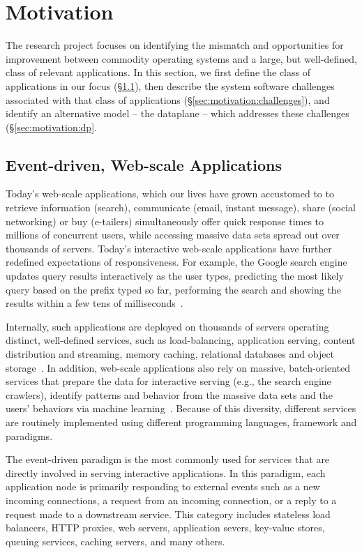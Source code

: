 
\section{Motivation}
\label{sec:motivation}

The research project focuses on identifying the mismatch and
opportunities for improvement between commodity operating systems and
a large, but well-defined, class of relevant applications.  In this
section, we first define the class of applications in our focus
(\S\ref{sec:motivation:web}), then describe the system software
challenges associated with that class of applications
(\S\ref{sec:motivation:challenges}), and identify an alternative model --
the dataplane -- which addresses these challenges
(\S\ref{sec:motivation:dp}.

\subsection{Event-driven, Web-scale Applications}
\label{sec:motivation:web}

Today's web-scale applications, which our lives have grown accustomed
to to retrieve information (search), communicate (email, instant
message), share (social networking) or buy (e-tailers) simultaneously
offer quick response times to millions of concurrent users, while
accessing massive data sets spread out over thousands of servers.
Today's interactive web-scale applications have further redefined
expectations of responsiveness. For example, the Google search engine
updates query results interactively as the user types, predicting the
most likely query based on the prefix typed so far, performing the
search and showing the results within a few tens of
milliseconds~\cite{DBLP:journals/cacm/DeanB13}.

Internally, such applications are deployed on thousands of servers
operating distinct, well-defined services, such as load-balancing,
application serving, content distribution and streaming, memory
caching, relational databases and object storage~\cite{missing}.  In
addition, web-scale applications also rely on massive, batch-oriented
services that prepare the data for interactive serving (e.g., the
search engine crawlers), identify patterns and behavior from the
massive data sets and the users' behaviors via machine
learning~\cite{missing}.  Because of this diversity, different
services are routinely implemented using different programming
languages, framework and paradigms.

The event-driven paradigm is the most commonly used for services that
are directly involved in serving interactive applications.  In this
paradigm, each application node is primarily responding to external
events such as a new incoming connections, a request from an incoming
connection, or a reply to a request made to a downstream service.
This category includes stateless load balancers, HTTP proxies, web
servers, application severs, key-value stores, queuing services,
caching servers, and many others.  

